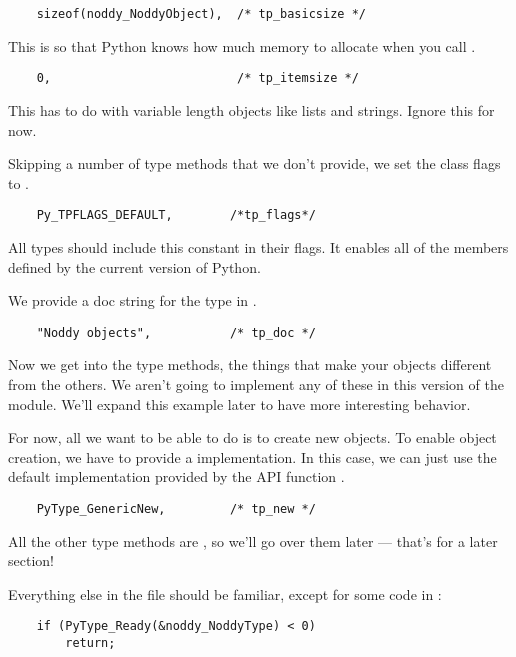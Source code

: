 \begin{verbatim}
    sizeof(noddy_NoddyObject),  /* tp_basicsize */
\end{verbatim}

This is so that Python knows how much memory to allocate when you call
.

\begin{verbatim}
    0,                          /* tp_itemsize */
\end{verbatim}

This has to do with variable length objects like lists and strings.
Ignore this for now.

Skipping a number of type methods that we don't provide, we set the
class flags to . 

\begin{verbatim}
    Py_TPFLAGS_DEFAULT,        /*tp_flags*/
\end{verbatim}

All types should include this constant in their flags.  It enables all
of the members defined by the current version of Python.

We provide a doc string for the type in .

\begin{verbatim}
    "Noddy objects",           /* tp_doc */
\end{verbatim}

Now we get into the type methods, the things that make your objects
different from the others.  We aren't going to implement any of these
in this version of the module.  We'll expand this example later to 
have more interesting behavior.  

For now, all we want to be able to do is to create new 
objects. To enable object creation, we have to provide a
 implementation. In this case, we can just use the
default implementation provided by the API function
.

\begin{verbatim}
    PyType_GenericNew,         /* tp_new */
\end{verbatim}

All the other type methods are \NULL, so we'll go over them later
--- that's for a later section!

Everything else in the file should be familiar, except for some code
in :

\begin{verbatim}
    if (PyType_Ready(&noddy_NoddyType) < 0)
        return;
\end{verbatim}

